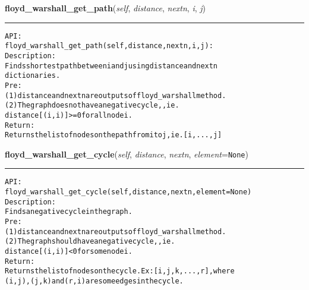 \hspace{.8\funcindent}\begin{boxedminipage}{\funcwidth}

    \raggedright \textbf{floyd\_warshall\_get\_path}(\textit{self}, \textit{distance}, \textit{nextn}, \textit{i}, \textit{j})

    \vspace{-1.5ex}

    \rule{\textwidth}{0.5\fboxrule}
\setlength{\parskip}{2ex}
\begin{alltt}

API:
    floyd\_warshall\_get\_path(self, distance, nextn, i, j):
Description:
    Finds shortest path between i and j using distance and nextn
    dictionaries.
Pre:
    (1) distance and nextn are outputs of floyd\_warshall method.
    (2) The graph does not have a negative cycle, , ie.
    distance[(i,i)] {\textgreater}=0 for all node i.
Return:
    Returns the list of nodes on the path from i to j, ie. [i,...,j]
\end{alltt}

\setlength{\parskip}{1ex}
    \end{boxedminipage}

    \label{coinor:gimpy:graph:Graph:floyd_warshall_get_cycle}

    \vspace{0.5ex}

\hspace{.8\funcindent}\begin{boxedminipage}{\funcwidth}

    \raggedright \textbf{floyd\_warshall\_get\_cycle}(\textit{self}, \textit{distance}, \textit{nextn}, \textit{element}={\tt None})

    \vspace{-1.5ex}

    \rule{\textwidth}{0.5\fboxrule}
\setlength{\parskip}{2ex}
\begin{alltt}

API:
    floyd\_warshall\_get\_cycle(self, distance, nextn, element = None)
Description:
    Finds a negative cycle in the graph.
Pre:
    (1) distance and nextn are outputs of floyd\_warshall method.
    (2) The graph should have a negative cycle, , ie.
    distance[(i,i)] {\textless} 0 for some node i.
Return:
    Returns the list of nodes on the cycle. Ex: [i,j,k,...,r], where
    (i,j), (j,k) and (r,i) are some edges in the cycle.
\end{alltt}

\setlength{\parskip}{1ex}
    \end{boxedminipage}

